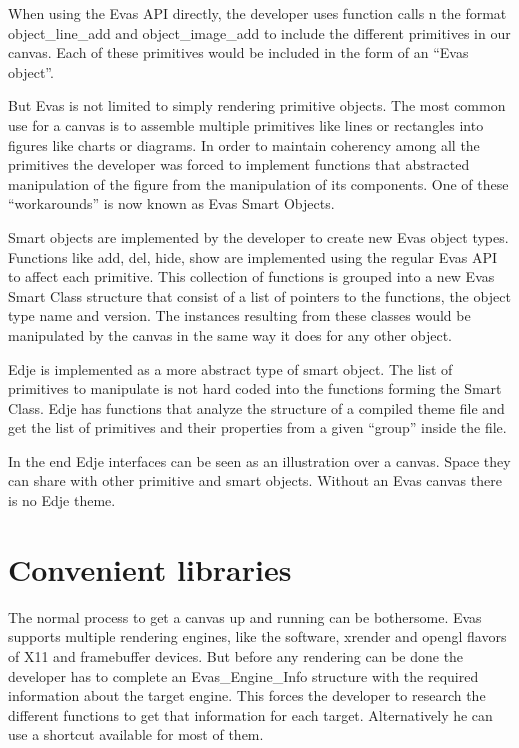 \documentclass[12pt,a4paper,english]{book}
\begin{document}
When using the Evas API directly, the developer uses function calls n the format
object{\_}line{\_}add and object{\_}image{\_}add to include the different primitives in our
canvas. Each of these primitives would be included in the form of an ``Evas
object''.

But Evas is not limited to simply rendering primitive objects. The most common
use for a canvas is to assemble multiple primitives like lines or rectangles
into figures like charts or diagrams. In order to maintain coherency among all
the primitives the developer was forced to implement functions that abstracted
manipulation of the figure from the manipulation of its components. One of
these ``workarounds'' is now known as Evas Smart Objects.

Smart objects are implemented by the developer to create new Evas object types.
Functions like add, del, hide, show are implemented using the regular Evas API
to affect each primitive. This collection of functions is grouped into a new
Evas Smart Class structure that consist of a list of pointers to the functions,
the object type name and version. The instances resulting from these classes
would be manipulated by the canvas in the same way it does for any other
object.

Edje is implemented as a more abstract type of smart object. The list of
primitives to manipulate is not hard coded into the functions forming the Smart
Class. Edje has functions that analyze the structure of a compiled theme file
and get the list of primitives and their properties from a given ``group'' inside
the file.

In the end Edje interfaces can be seen as an illustration over a canvas. Space
they can share with other primitive and smart objects. Without an Evas canvas
there is no Edje theme.



\hypertarget{convenient-libraries}{}
\section{Convenient libraries}

The normal process to get a canvas up and running can be bothersome. Evas
supports multiple rendering engines, like the software, xrender and opengl
flavors of X11 and framebuffer devices. But before any rendering can be done
the developer has to complete an Evas{\_}Engine{\_}Info structure with the required
information about the target engine. This forces the developer to research the
different functions to get that information for each target. Alternatively he
can use a shortcut available for most of them.
\end{document}
